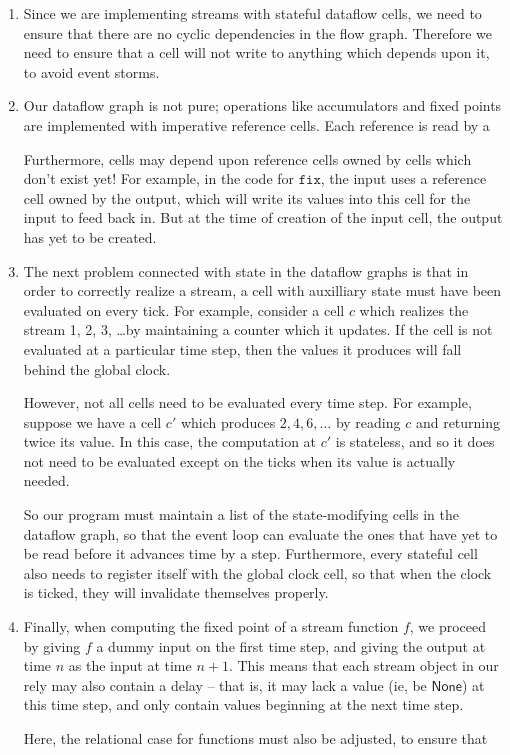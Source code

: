 \documentclass[preprint]{sigplanconf}
\newcommand{\term}[1]{\ensuremath{\mathtt{{#1}}}}
\newcommand{\None}{\mathsf{None}}
\begin{document}
\begin{enumerate}
\item Since we are implementing streams with stateful dataflow 
  cells, we need to ensure that there are no cyclic dependencies 
  in the flow graph. Therefore we need to ensure that a cell will
  not write to anything which depends upon it, to avoid event storms. 

\item Our dataflow graph is not pure; operations like accumulators and
  fixed points are implemented with imperative reference cells.  Each
  reference is read by a 

  Furthermore, cells may depend upon reference cells owned by cells
  which don't exist yet! For example, in the code for \term{fix}, the
  input uses a reference cell owned by the output, which will write
  its values into this cell for the input to feed back in. But at the
  time of creation of the input cell, the output has yet to be
  created.

\item The next problem connected with state in the dataflow graphs is
  that in order to correctly realize a stream, a cell with auxilliary
  state must have been evaluated on every tick. For example, consider
  a cell $c$ which realizes the stream 1, 2, 3, \ldots by maintaining
  a counter which it updates. If the cell is not evaluated at a
  particular time step, then the values it produces will fall behind
  the global clock.

  However, not all cells need to be evaluated every time step. For
  example, suppose we have a cell $c'$ which produces $2, 4, 6,
  \ldots$ by reading $c$ and returning twice its value. In this case,
  the computation at $c'$ is stateless, and so it does not need to be
  evaluated except on the ticks when its value is actually needed.

  So our program must maintain a list of the state-modifying cells in
  the dataflow graph, so that the event loop can evaluate the ones
  that have yet to be read before it advances time by a step. Furthermore, 
  every stateful cell also needs to register itself with the global clock
  cell, so that when the clock is ticked, they will invalidate themselves
  properly. 

\item Finally, when computing the fixed point of a stream function
  $f$, we proceed by giving $f$ a dummy input on the first time step,
  and giving the output at time $n$ as the input at time $n+1$. This
  means that each stream object in our rely may also contain a delay
  -- that is, it may lack a value (ie, be $\None$) at this time step,
  and only contain values beginning at the next time step.

  Here, the relational case for functions must also be adjusted, to 
  ensure that 
\end{enumerate}
\end{document}
